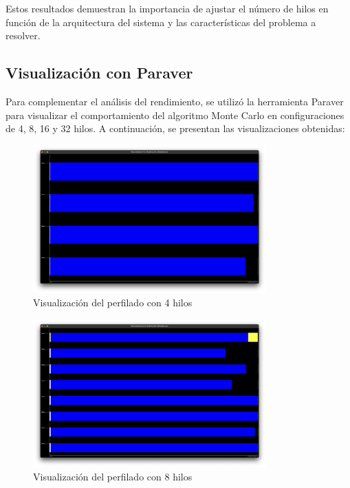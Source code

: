 \documentclass[a4paper, 10pt, onecolumn]{IEEEtran}
\begin{document}
Estos resultados demuestran la importancia de ajustar el número de hilos en función de la arquitectura del sistema y las características del problema a resolver.

\subsection{Visualización con Paraver}

Para complementar el análisis del rendimiento, se utilizó la herramienta Paraver \cite{paraver} para visualizar el comportamiento del algoritmo Monte Carlo en configuraciones de 4, 8, 16 y 32 hilos. A continuación, se presentan las visualizaciones obtenidas:

\begin{figure}[H]
  \centering
  \includegraphics[width=0.8\textwidth]{./img/paraver-4threads.png}
  \caption{Visualización del perfilado con 4 hilos}
  \label{fig:paraver_4threads}
\end{figure}

\begin{figure}[H]
  \centering
  \includegraphics[width=0.8\textwidth]{./img/paraver-8threads.png}
  \caption{Visualización del perfilado con 8 hilos}
  \label{fig:paraver_8threads}
\end{figure}
\end{document}
